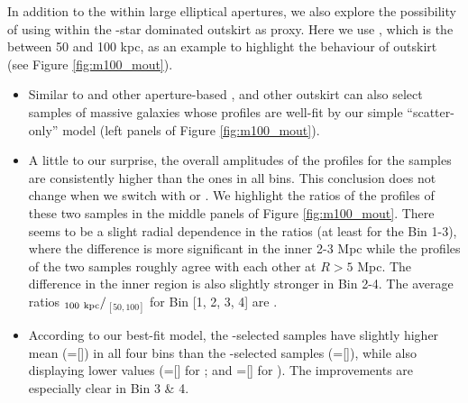 \documentclass[fleqn,usenatbib,useAMS,english]{mnras}
\begin{document}



    In addition to the \mstar{} within large elliptical apertures, we also explore the possibility
    of using \mstar{} within the \exsitu{}-star dominated outskirt as \mvir{} proxy.
    Here we use , which is the \mstar{} between 50 and 100 kpc, as an example to
    highlight the behaviour of outskirt \mstar{} (see Figure \ref{fig:m100_mout}).

    \begin{itemize}

        \item Similar to  and other aperture-based \mstar{},  and other
            outskirt \mstar{} can also select samples of massive galaxies whose \dsigma{} profiles
            are well-fit by our simple ``scatter-only'' model (left panels of
            Figure \ref{fig:m100_mout}).

        \item A little to our surprise, the overall amplitudes of the \dsigma{} profiles for the
             samples are consistently higher than the  ones in all
            bins. This conclusion does not change when we switch  with  or
            \mmax{}. We highlight the ratios of the \dsigma{} profiles of these two samples in
            the middle panels of Figure \ref{fig:m100_mout}.
            There seems to be a slight radial dependence in the ratios (at least for the Bin
            1-3), where the difference is more significant in the inner 2-3 Mpc while the
            \dsigma{} profiles of the two samples roughly agree with each other at $R>5$ Mpc.
            The difference in the inner region is also slightly stronger in Bin 2-4.
            The average ratios \dsigma{}$_{100\ \rm kpc}/$\dsigma{}$_[50,100]$ for Bin [1, 2, 3, 4]
            are .

        \item According to our best-fit model, the -selected samples have slightly
            higher mean \mvir{} (\logmvir{}=[]) in all four bins than the
            -selected samples (\logmvir{}=[]), while also
            displaying lower \sigmh{} values
            (\sigmh{}=[] for ; and
             \sigmh{}=[] for ).
            The improvements are especially clear in Bin 3 \& 4.



\end{itemize}
\end{document}
